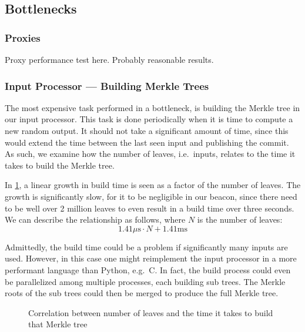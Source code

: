 \subsection{Bottlenecks}%
\label{sub:bottlenecks}

\subsubsection{Proxies}%
\label{ssub:proxies}
Proxy performance test here.
Probably reasonable results.


\subsubsection{Input Processor --- Building Merkle Trees}%
\label{ssub:input_processor_building_merkle_trees}
The most expensive task performed in a bottleneck, is building the Merkle tree in our input processor.
This task is done periodically when it is time to compute a new random output.
It should not take a significant amount of time, since this would extend the time between the last seen input and publishing the commit.
As such, we examine how the number of leaves, i.e.\ inputs, relates to the time it takes to build the Merkle tree.

In \cref{fig:merkle_build}, a linear growth in build time is seen as a factor of the number of leaves.
The growth is significantly slow, for it to be negligible in our beacon, since there need to be well over 2 million leaves to even result in a build time over three seconds.
We can describe the relationship as follows, where $N$ is the number of leaves:
$$
1.41 \mu\text{s} \cdot N + 1.41 \text{ms}
$$

Admittedly, the build time could be a problem if significantly many inputs are used.
However, in this case one might reimplement the input processor in a more performant language than Python, e.g.\ C.
In fact, the build process could even be parallelized among multiple processes, each building sub trees.
The Merkle roots of the sub trees could then be merged to produce the full Merkle tree.

\begin{figure}
    \centering
    \caption{Correlation between number of leaves and the time it takes to build that Merkle tree}%
    \label{fig:merkle_build}
\end{figure}
